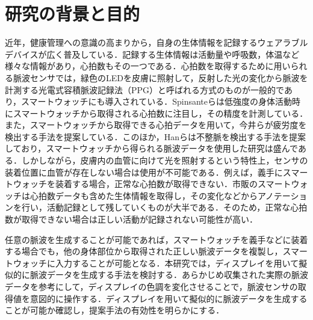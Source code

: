 \documentclass[submit,techrep]{ipsj}
\begin{document}
\section{研究の背景と目的}
近年，健康管理への意識の高まりから，自身の生体情報を記録するウェアラブルデバイスが広く普及している．記録する生体情報は活動量や呼吸数，体温など様々な情報があり，心拍数もその一つである．心拍数を取得するために用いられる脈波センサでは，緑色のLEDを皮膚に照射して，反射した光の変化から脈波を計測する光電式容積脈波記録法（PPG）と呼ばれる方式のものが一般的であり，スマートウォッチにも導入されている．Spinsanteら\cite{accuracy_in_low_intensity}は低強度の身体活動時にスマートウォッチから取得される心拍数に注目し，その精度を計測している．また，スマートウォッチから取得できる心拍データを用いて，今井ら\cite{fatigue_detection}が疲労度を検出する手法を提案している．このほか，Hanら\cite{arrhythmia_detection}は不整脈を検出する手法を提案しており，スマートウォッチから得られる脈波データを使用した研究は盛んである．しかしながら，皮膚内の血管に向けて光を照射するという特性上，センサの装着位置に血管が存在しない場合は使用が不可能である．例えば，義手にスマートウォッチを装着する場合，正常な心拍数が取得できない．市販のスマートウォッチは心拍数データも含めた生体情報を取得し，その変化などからアノテーションを行い，活動記録として残していくものが大半である．そのため，正常な心拍数が取得できない場合は正しい活動が記録されない可能性が高い．
\par

任意の脈波を生成することが可能であれば，スマートウォッチを義手などに装着する場合でも，他の身体部位から取得された正しい脈波データを複製し，スマートウォッチに入力することが可能となる．本研究では，ディスプレイを用いて擬似的に脈波データを生成する手法を検討する．あらかじめ収集された実際の脈波データを参考にして，ディスプレイの色調を変化させることで，脈波センサの取得値を意図的に操作する．ディスプレイを用いて擬似的に脈波データを生成することが可能か確認し，提案手法の有効性を明らかにする．
\end{document}
